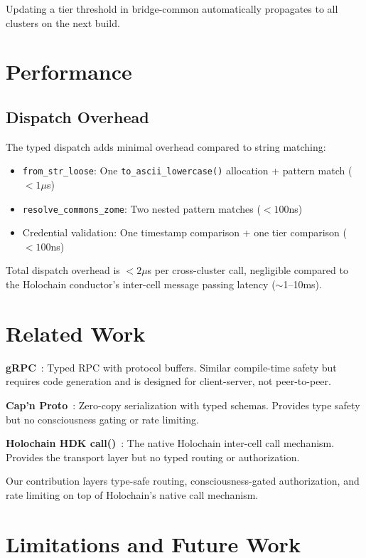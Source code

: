 \documentclass[11pt,twocolumn]{article}
\begin{document}
Updating a tier threshold in bridge-common automatically propagates to all
clusters on the next build.

\section{Performance}

\subsection{Dispatch Overhead}

The typed dispatch adds minimal overhead compared to string matching:

\begin{itemize}[nosep]
  \item \texttt{from\_str\_loose}: One \texttt{to\_ascii\_lowercase()} allocation
    + pattern match ($<1\mu$s)
  \item \texttt{resolve\_commons\_zome}: Two nested pattern matches ($<100$ns)
  \item Credential validation: One timestamp comparison + one tier comparison
    ($<100$ns)
\end{itemize}

Total dispatch overhead is $<2\mu$s per cross-cluster call, negligible
compared to the Holochain conductor's inter-cell message passing latency
($\sim$1--10ms).

\section{Related Work}

\textbf{gRPC}~\cite{grpc}: Typed RPC with protocol buffers. Similar
compile-time safety but requires code generation and is designed for
client-server, not peer-to-peer.

\textbf{Cap'n Proto}~\cite{capnproto}: Zero-copy serialization with typed
schemas. Provides type safety but no consciousness gating or rate limiting.

\textbf{Holochain HDK call()}~\cite{brock2018}: The native Holochain
inter-cell call mechanism. Provides the transport layer but no typed
routing or authorization.

Our contribution layers type-safe routing, consciousness-gated authorization,
and rate limiting on top of Holochain's native call mechanism.

\section{Limitations and Future Work}
\end{document}
